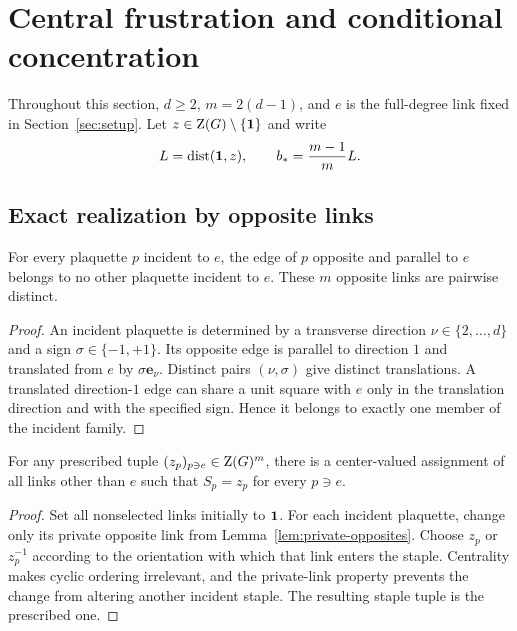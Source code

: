 \section{Central frustration and conditional concentration}
\label{sec:main-results}

Throughout this section, $d\geq2$, $m=2(d-1)$, and $e$ is the full-degree
link fixed in Section~\ref{sec:setup}.  Let $z\in\mathrm Z(G)\setminus\{\mathbf 1\}$ and
write
\begin{equation}\label{eq:L-bstar}
  L=\operatorname{dist}(\mathbf 1,z),\qquad b_*=\frac{m-1}{m}L.
\end{equation}

\subsection{Exact realization by opposite links}

\begin{lemma}\label{lem:private-opposites}
For every plaquette $p$ incident to $e$, the edge of $p$ opposite and parallel
to $e$ belongs to no other plaquette incident to $e$.  These $m$ opposite
links are pairwise distinct.
\end{lemma}

\begin{proof}
An incident plaquette is determined by a transverse direction
$\nu\in\{2,\ldots,d\}$ and a sign $\sigma\in\{-1,+1\}$.  Its opposite edge
is parallel to direction $1$ and translated from $e$ by
$\sigma\mathbf e_\nu$.  Distinct pairs $(\nu,\sigma)$ give distinct
translations.  A translated direction-$1$ edge can share a unit square with
$e$ only in the translation direction and with the specified sign.  Hence it
belongs to exactly one member of the incident family.
\end{proof}

\begin{proposition}\label{prop:central-surjectivity}
For any prescribed tuple $(z_p)_{p\ni e}\in\mathrm Z(G)^m$, there is a
center-valued assignment of all links other than $e$ such that
$S_p=z_p$ for every $p\ni e$.
\end{proposition}

\begin{proof}
Set all nonselected links initially to $\mathbf 1$.  For each incident plaquette,
change only its private opposite link from Lemma~\ref{lem:private-opposites}.
Choose $z_p$ or $z_p^{-1}$ according to the orientation with which that link
enters the staple.  Centrality makes cyclic ordering irrelevant, and the
private-link property prevents the change from altering another incident
staple.  The resulting staple tuple is the prescribed one.
\end{proof}

